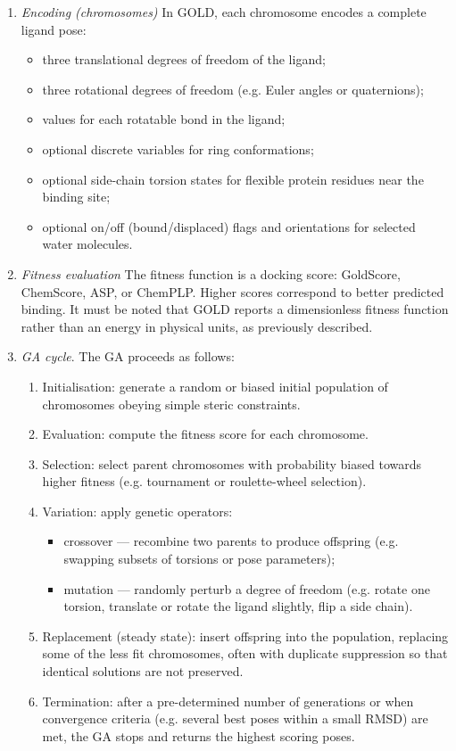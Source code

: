 \documentclass[12pt]{article}
\begin{document}
\begin{enumerate}
\item \emph{Encoding (chromosomes)}
In GOLD, each chromosome encodes a complete ligand pose:
\begin{itemize}
    \item three translational degrees of freedom of the ligand;
    \item three rotational degrees of freedom (e.g. Euler angles or quaternions);
    \item values for each rotatable bond in the ligand;
    \item optional discrete variables for ring conformations;
    \item optional side-chain torsion states for flexible protein residues near the binding site;
    \item optional on/off (bound/displaced) flags and orientations for selected water molecules.
\end{itemize}

\item \emph{Fitness evaluation}
The fitness function is a docking score: GoldScore, ChemScore, ASP, or ChemPLP. Higher scores correspond to better predicted binding. It must be noted that GOLD reports a dimensionless fitness function rather than an energy in physical units, as previously described.

\item \emph{GA cycle}.
The GA proceeds as follows:
\begin{enumerate}
    \item Initialisation: generate a random or biased initial population of chromosomes obeying simple steric constraints.
    \item Evaluation: compute the fitness score for each chromosome.
    \item Selection: select parent chromosomes with probability biased towards higher fitness (e.g. tournament or roulette-wheel selection).
    \item Variation: apply genetic operators:
    \begin{itemize}
        \item crossover — recombine two parents to produce offspring (e.g. swapping subsets of torsions or pose parameters);
        \item mutation — randomly perturb a degree of freedom (e.g. rotate one torsion, translate or rotate the ligand slightly, flip a side chain).
    \end{itemize}
    \item Replacement (steady state): insert offspring into the population, replacing some of the less fit chromosomes, often with duplicate suppression so that identical solutions are not preserved.
    \item Termination: after a pre-determined number of generations or when convergence criteria (e.g. several best poses within a small RMSD) are met, the GA stops and returns the highest scoring poses.
\end{enumerate}
\end{enumerate}
\end{document}
